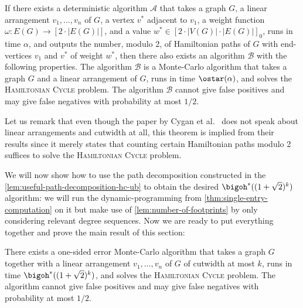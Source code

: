 \documentclass[a4paper,UKenglish,cleveref, autoref, thm-restate]{lipics-v2021}
\begin{document}
\begin{theorem}\label{thm:cygan-et-al}
	If there exists a deterministic algorithm $\mathcal{A}$ that takes a graph $G$, a linear arrangement $v_1, \dots, v_n$ of $G$, a vertex $v^*$ adjacent to $v_1$, a weight function $\omega \colon E(G) \to [2\cdot|E(G)|]$, and a value $w^* \in [2 \cdot |V(G)| \cdot |E(G)|]_0$, runs in time $\alpha$, and outputs the number, modulo 2, of Hamiltonian paths of $G$ with end-vertices $v_1$ and $v^*$ of weight $w^*$, then there also exists an algorithm $\mathcal{B}$ with the following properties. 
	The algorithm $\mathcal{B}$ is a Monte-Carlo algorithm that takes a graph $G$ and a linear arrangement of $G$, runs in time $\ostar(\alpha)$, and solves the \textsc{Hamiltonian Cycle} problem.
	The algorithm $\mathcal{B}$ cannot give false positives and may give false negatives with probability at most $1/2$. 
\end{theorem}
Let us remark that even though the paper by Cygan et al.~\cite{DBLP:journals/jacm/CyganKN18} does not speak about linear arrangements and cutwidth at all, this theorem is implied from their results since it merely states that counting certain Hamiltonian paths modulo 2 suffices to solve the \textsc{Hamiltonian Cycle} problem.

We will now show how to use the path decomposition constructed in the \cref{lem:useful-path-decomposition-hc-ub} to obtain the desired $\bigoh^*((1+\sqrt{2})^k)$ algorithm: we will run the dynamic-programming from \cref{thm:single-entry-computation} on it but make use of \cref{lem:number-of-footprints} by only considering relevant degree sequences. 
Now we are ready to put everything together and prove the main result of this section:
\begin{theorem}
	There exists a one-sided error Monte-Carlo algorithm that takes a graph $G$ together with a linear arrangement 
	$v_1, \dots, v_n$ 
	of $G$ of cutwidth at most $k$, runs in time $\bigoh^*((1+\sqrt{2})^k)$, and solves the {\textsc{Hamiltonian Cycle}} problem.
	The algorithm cannot give false positives and may give false negatives with probability at most $1/2$.
\end{theorem}
\end{document}
